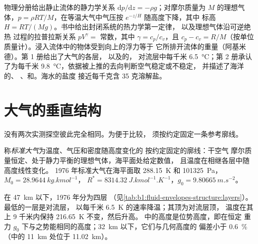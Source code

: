 \begin{recall}
物理分册给出静止流体的静力学关系 $\mathrm dp/\mathrm dz =
-\rho g$；对摩尔质量为 $M$ 的理想气体，$p = \rho R
T/M$，在等温大气中气压按 $e^{-z/H}$ 随高度下降，其中
标高 $H = RT/(Mg)$。书中给出封闭系统的热力学第一定律，
以及理想气体沿可逆绝热
过程的拉普拉斯关系 $pV^{\gamma} = $ 常数，其中 $\gamma = c_p/c_v$，且 $c_p - c_v
= R/M$（按单位质量计）。浸入流体中的物体受到向上的浮力等于
它所排开流体的重量（阿基米德）。第 1 册给出了大气的各层，
以及的，
对流层中每千米 \qty{6.5}{\celsius}；第 2 册承认了为每千米 \qty{9.8}{\celsius}，依据被上推的去向判断空气稳定或不稳定，
并描述了海洋的、
、和。海水的盐度
接近每千克含 35 克溶解盐。
\end{recall}

\section{大气的垂直结构}\label{sec:b1:fluid-envelopes-structure:atmosphere}

没有两次实测探空彼此完全相同。为便于比较，
须按约定固定一条参考廓线。

\begin{definition}[标准大气]\label{def:b1:fluid-envelopes-structure:standard-atmosphere}
称\emph{标准大气}为温度、气压和密度随高度变化的
按约定固定的廓线：干空气
摩尔质量恒定、处于静力平衡的理想气体，海平面处给定数值，
且温度在相继各层中随高度线性变化。
1976 年标准大气在海平面取 \qty{288.15}{K} 和
\qty{101325}{Pa}，$M_0 = \qty{28.9644}{kg.kmol^{-1}}$，
$R^* = \qty{8314.32}{J.kmol^{-1}.K^{-1}}$，$g_0 = \qty{9.80665}{m.s^{-2}}$。
\end{definition}

在 \qty{47}{km} 以下，1976 年分为四层
（见\cref{tab:b1:fluid-envelopes-structure:layers}）。最低的一层是对流层，
以每千米 \qty{6.5}{K} 的速率降温；其顶为对流层顶，
温度在其上 9 千米内保持 \qty{216.65}{K} 不变，然后升高。
中的高度是位势高度，即在恒定
重力 $g_0$ 下与之势能相同的高度；\qty{32}{km} 以下，它们与几何高度的
偏差小于 \qty{0.6}{\percent}
（中的 \qty{11}{km} 处位于 \qty{11.02}{km}）。

